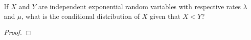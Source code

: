 \begin{problem}{5.8}
  If $X$ and $Y$ are independent exponential random variables with respective rates
  $\lambda$ and $\mu$, what is the conditional distribution of $X$ given that $X < Y$?
\end{problem}

\begin{proof}
\end{proof}
\newpage
